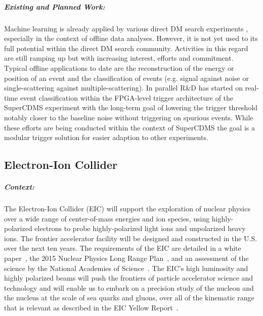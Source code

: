 \subparagraph*{Existing and Planned Work:} Machine learning is already applied by various direct DM search experiments \cite{Khosa_2020, Szydagis:2021hfh, Simola_2019}, especially in the context of offline data analyses. 
However, it is not yet used to its full potential within the direct DM search community. 
Activities in this regard are still ramping up but with increasing interest, efforts and commitment. 
Typical offline applications to date are the reconstruction of the energy or position of an event and the classification of events (e.g. signal against noise or single-scattering against multiple-scattering). 
In parallel R\&D has started on real-time event classification within the FPGA-level trigger architecture of the SuperCDMS experiment \cite{Agnese_2017} with the long-term goal of lowering the trigger threshold notably closer to the baseline noise without triggering on spurious events. While these efforts are being conducted within the context of SuperCDMS the goal is a modular trigger solution for easier adaption to other experiments.

\subsection{Electron-Ion Collider}

\subparagraph*{Context:}
        The Electron-Ion Collider (EIC) will support the exploration of nuclear physics over a wide range of center-of-mass energies and ion species, using highly-polarized electrons to probe highly-polarized light ions and unpolarized heavy ions. The frontier accelerator facility will be designed and constructed in the U.S. over the next ten years. The requirements of the EIC are detailed in a white paper~\cite{Accardi:2012qut}, the 2015 Nuclear Physics Long Range Plan~\cite{Geesaman:2015fha}, and an assessment of the science by the National Academies of Science~\cite{NAS:2018eic}. 
        The EIC's high luminosity and highly polarized beams will push the frontiers of particle accelerator science and technology and will enable us to embark on a precision study of the nucleon and the nucleus at the scale of sea quarks and gluons, over all of the kinematic range that is relevant as described in the EIC Yellow Report~\cite{AbdulKhalek:2021gbh}. 

